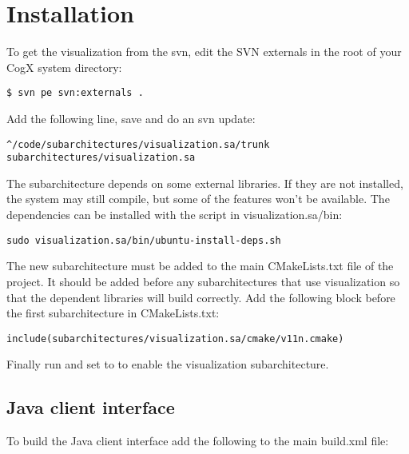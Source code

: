 
\section{Installation}

To get the visualization from the svn, edit the SVN externals in the root
of your CogX system directory:

\begin{Verbatim}[fontsize=\scriptsize,gobble=3]
   $ svn pe svn:externals .
\end{Verbatim}

Add the following line, save and do an svn update:

\begin{Verbatim}[fontsize=\scriptsize,gobble=3]
   ^/code/subarchitectures/visualization.sa/trunk subarchitectures/visualization.sa
\end{Verbatim}

The subarchitecture depends on some external libraries. If they are not
installed, the system may still compile, but some of the features won't be
available. The dependencies can be installed with the script in
visualization.sa/bin: 

\begin{Verbatim}[fontsize=\scriptsize,gobble=3]
   sudo visualization.sa/bin/ubuntu-install-deps.sh
\end{Verbatim}

The new subarchitecture must be added to the main CMakeLists.txt file of the 
project. It should be added before any subarchitectures that use visualization
so that the dependent libraries will build correctly. Add the following
block before the first subarchitecture in CMakeLists.txt:

\begin{Verbatim}[fontsize=\scriptsize,gobble=3]
   include(subarchitectures/visualization.sa/cmake/v11n.cmake)
\end{Verbatim}

Finally run  and set  to  to enable
the visualization subarchitecture.

\subsection{Java client interface}

To build the Java client interface add the following to the main build.xml file:

